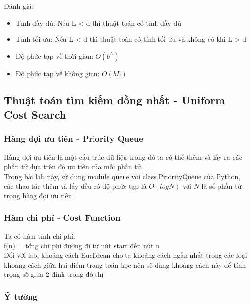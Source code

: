 \documentclass{article}
\begin{document}
Đánh giá:\newline
\begin{itemize}
\item Tính đầy đủ: Nếu L < d thì thuật toán có tính đầy đủ
\item Tính tối ưu: Nếu L < d thì thuật toán có tính tối ưu và không có khi L > d
\item Độ phức tạp về thời gian: $O(b^L)$
\item Độ phức tạp về không gian: $O(bL)$

\end{itemize}

\subsection{Thuật toán tìm kiếm đồng nhất - Uniform Cost Search}

\subsubsection{Hàng đợi ưu tiên - Priority Queue}
Hàng đợi ưu tiên là một cấu trúc dữ liệu trong đó ta có thể thêm và lấy ra các phần tử dựa trên độ ưu tiên của mỗi phần tử. \\
Trong bài lab này, sử dụng module queue với class PriorityQueue của Python, các thao tác thêm và lấy đều có độ phức tạp là $O(logN)$ với $N$ là số phần tử trong hàng đợi ưu tiên.

\subsubsection{Hàm chi phí - Cost Function}
Ta có hàm tính chi phí:\\
f(n) = tổng chi phí đường đi từ nút start đến nút n\\
Đối với lab, khoảng cách Euclidean cho ta khoảng cách ngắn nhất trong các loại khoảng cách giữa hai điểm trong toán học nên sẽ dùng khoảng cách này để tính trọng số giữa 2 đỉnh trong đồ thị

\subsubsection{Ý tưởng}
\end{document}
